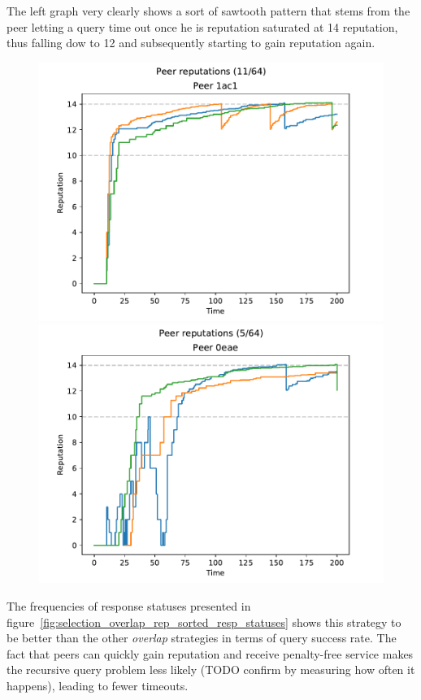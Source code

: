 The left graph very clearly shows a sort of sawtooth pattern that stems from the
peer letting a query time out once he is reputation saturated at 14 reputation,
thus falling dow to 12 and subsequently starting to gain reputation again.

\begin{figure}[t]
\centering
\includegraphics[width=0.5\columnwidth]{figures/selection_overlap_rep_sorted_peer_reps_11_of_64}%
\includegraphics[width=0.5\columnwidth]{figures/selection_overlap_rep_sorted_peer_reps_5_of_64}
\label{fig:selection_overlap_rep_sorted_peer_reps}
\end{figure}

The frequencies of response statuses presented in
figure~\ref{fig:selection_overlap_rep_sorted_resp_statuses} shows this
strategy to be better than the other \emph{overlap} strategies in terms of query
success rate. The fact that peers can quickly gain reputation and receive
penalty-free service makes the recursive query problem less likely (TODO confirm
by measuring how often it happens), leading to fewer timeouts.


